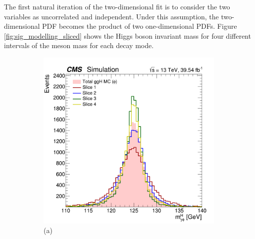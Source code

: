 The first natural iteration of the two-dimensional fit is to consider the two variables as uncorrelated and independent. Under this assumption, the two-dimensional PDF becomes the product of two one-dimensional PDFs. Figure \ref{fig:sig_modelling_sliced} shows the Higgs boson invariant mass for four different intervals of the meson mass for each decay mode.
\begin{figure}[!ht]
    \captionsetup[subfigure]{labelformat=empty}
    \vspace*{-0.2cm}
    \centering
    \setlength{\mylength}{\textwidth}
    \begin{subfigure}[t]{0.50\mylength}
        \centering
        \includegraphics[width=0.49\mylength]{resources/plots/Phi3_fit_SGN_MH_sliced.png}
        \vspace*{-0.2cm}
        \caption{\footnotesize (a)}
    \end{subfigure}%
    \begin{subfigure}[t]{0.50\mylength}
        \centering

\end{subfigure}
\end{figure}
